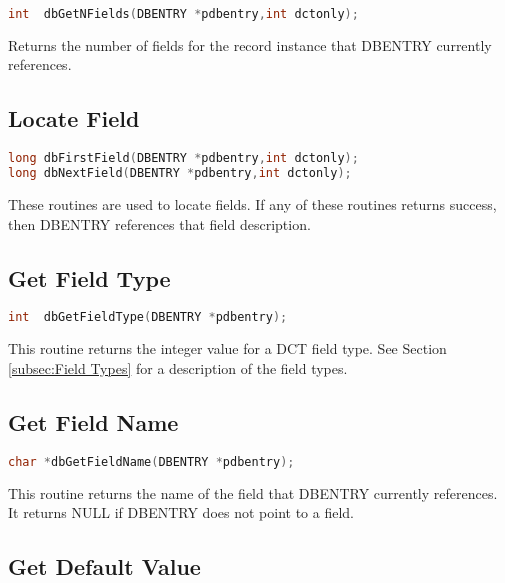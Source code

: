\begin{lstlisting}[language=C]
int  dbGetNFields(DBENTRY *pdbentry,int dctonly);
\end{lstlisting}

Returns the number of fields for the record instance that DBENTRY currently references.

\subsection{Locate Field}

\begin{lstlisting}[language=C]
long dbFirstField(DBENTRY *pdbentry,int dctonly);
long dbNextField(DBENTRY *pdbentry,int dctonly);
\end{lstlisting}

These routines are used to locate fields. If any of these routines returns success, then DBENTRY references that field 
description. 

\subsection{Get Field Type}

\begin{lstlisting}[language=C]
int  dbGetFieldType(DBENTRY *pdbentry);
\end{lstlisting}

This routine returns the integer value for a DCT field type.
See Section \ref{subsec:Field Types} for a description of the field types.

\subsection{Get Field Name}

\begin{lstlisting}[language=C]
char *dbGetFieldName(DBENTRY *pdbentry);
\end{lstlisting}

This routine returns the name of the field that DBENTRY currently references. It returns NULL if DBENTRY does not 
point to a field.

\subsection{Get Default Value}

